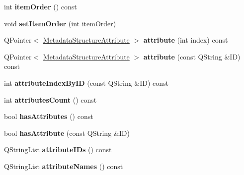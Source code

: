 \begin{DoxyCompactItemize}
int {\bfseries item\+Order} () const
\item 
\mbox{\label{class_metadata_structure_section_a5750f87ead80911a43414ad69aeb09d1}} 
void {\bfseries set\+Item\+Order} (int item\+Order)
\item 
\mbox{\label{class_metadata_structure_section_a33e112913b96322c30fe43607cc5c2ab}} 
Q\+Pointer$<$ \hyperlink{class_metadata_structure_attribute}{Metadata\+Structure\+Attribute} $>$ {\bfseries attribute} (int index) const
\item 
\mbox{\label{class_metadata_structure_section_a8a76b746412dcea03b1811973c7122b7}} 
Q\+Pointer$<$ \hyperlink{class_metadata_structure_attribute}{Metadata\+Structure\+Attribute} $>$ {\bfseries attribute} (const Q\+String \&ID) const
\item 
\mbox{\label{class_metadata_structure_section_ab4d8fb7c79c8ef0cf160d1d835b521bd}} 
int {\bfseries attribute\+Index\+By\+ID} (const Q\+String \&ID) const
\item 
\mbox{\label{class_metadata_structure_section_a9343003c07ea3f0eee271205d0452e3d}} 
int {\bfseries attributes\+Count} () const
\item 
\mbox{\label{class_metadata_structure_section_ac46b5149bfe6c88013dfd46c0055132e}} 
bool {\bfseries has\+Attributes} () const
\item 
\mbox{\label{class_metadata_structure_section_a301c2a96c4c17b11e18246963afe9c6a}} 
bool {\bfseries has\+Attribute} (const Q\+String \&ID)
\item 
\mbox{\label{class_metadata_structure_section_aba0479e7c7d545c767615e49f96d0f52}} 
Q\+String\+List {\bfseries attribute\+I\+Ds} () const
\item 
\mbox{\label{class_metadata_structure_section_ab2ff1c9e9c01ed25a3eff907e8a709e8}} 
Q\+String\+List {\bfseries attribute\+Names} () const
\item 

\end{DoxyCompactItemize}
